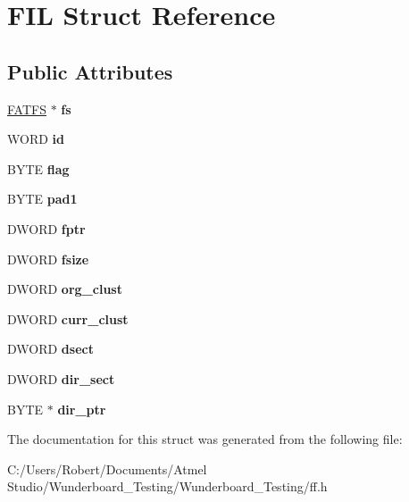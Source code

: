 \hypertarget{struct_f_i_l}{\section{F\-I\-L Struct Reference}
\label{struct_f_i_l}
}
\subsection*{Public Attributes}
\begin{DoxyCompactItemize}
\item 
\hypertarget{struct_f_i_l_a42376a6797a06228911c8b836c1e9030}{\hyperlink{struct_f_a_t_f_s}{F\-A\-T\-F\-S} $\ast$ {\bfseries fs}}\label{struct_f_i_l_a42376a6797a06228911c8b836c1e9030}

\item 
\hypertarget{struct_f_i_l_af7cae0063b0045fb7078b560101ba8f2}{W\-O\-R\-D {\bfseries id}}\label{struct_f_i_l_af7cae0063b0045fb7078b560101ba8f2}

\item 
\hypertarget{struct_f_i_l_ac409508881f5a16f2998ae675072b376}{B\-Y\-T\-E {\bfseries flag}}\label{struct_f_i_l_ac409508881f5a16f2998ae675072b376}

\item 
\hypertarget{struct_f_i_l_a17f891ef69059bd879f6492473cfceae}{B\-Y\-T\-E {\bfseries pad1}}\label{struct_f_i_l_a17f891ef69059bd879f6492473cfceae}

\item 
\hypertarget{struct_f_i_l_a75d29cf9257c827d117887b9f924c4a9}{D\-W\-O\-R\-D {\bfseries fptr}}\label{struct_f_i_l_a75d29cf9257c827d117887b9f924c4a9}

\item 
\hypertarget{struct_f_i_l_aa00790d40d7b0081c345fd4f76e22b70}{D\-W\-O\-R\-D {\bfseries fsize}}\label{struct_f_i_l_aa00790d40d7b0081c345fd4f76e22b70}

\item 
\hypertarget{struct_f_i_l_a4f1e56e6a80136657ccc290a118c2efd}{D\-W\-O\-R\-D {\bfseries org\-\_\-clust}}\label{struct_f_i_l_a4f1e56e6a80136657ccc290a118c2efd}

\item 
\hypertarget{struct_f_i_l_a2da40e259d82148254cca3f668d9951f}{D\-W\-O\-R\-D {\bfseries curr\-\_\-clust}}\label{struct_f_i_l_a2da40e259d82148254cca3f668d9951f}

\item 
\hypertarget{struct_f_i_l_ab3d4165d6fd32ac71a130d835fbf0b4d}{D\-W\-O\-R\-D {\bfseries dsect}}\label{struct_f_i_l_ab3d4165d6fd32ac71a130d835fbf0b4d}

\item 
\hypertarget{struct_f_i_l_ab203794f939ad4480e81dfa488770783}{D\-W\-O\-R\-D {\bfseries dir\-\_\-sect}}\label{struct_f_i_l_ab203794f939ad4480e81dfa488770783}

\item 
\hypertarget{struct_f_i_l_a5af9e9fb312b629220eaf684dd28c4a9}{B\-Y\-T\-E $\ast$ {\bfseries dir\-\_\-ptr}}\label{struct_f_i_l_a5af9e9fb312b629220eaf684dd28c4a9}

\end{DoxyCompactItemize}


The documentation for this struct was generated from the following file\-:\begin{DoxyCompactItemize}
\item 
C\-:/\-Users/\-Robert/\-Documents/\-Atmel Studio/\-Wunderboard\-\_\-\-Testing/\-Wunderboard\-\_\-\-Testing/ff.\-h\end{DoxyCompactItemize}
